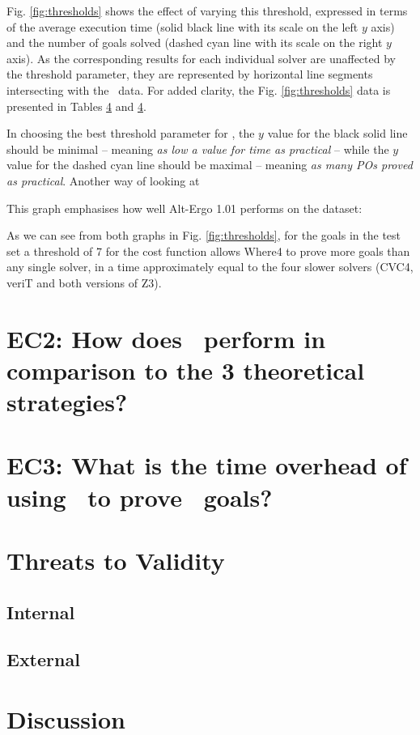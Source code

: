 Fig. \ref{fig:thresholds} shows the effect of varying this threshold, expressed in terms of the average execution time (solid black line with its scale on the left $y$ axis) and the number of goals solved (dashed cyan line with its scale on the right $y$ axis).
As the corresponding results for each individual solver are unaffected by the threshold parameter, they are represented by horizontal line segments intersecting with the \where~data.
For added clarity, the Fig. \ref{fig:thresholds} data is presented in Tables \ref{} and \ref{}.
  
In choosing the best threshold parameter for \where, the $y$ value for the black solid line should be minimal -- meaning \textit{as low a value for time as practical} -- while the $y$ value for the dashed cyan line should be maximal -- meaning \textit{as many POs proved as practical}. 
Another way of looking at 
 
This graph emphasises how well Alt-Ergo 1.01 performs on the dataset: 

As we can see from both graphs in Fig. \ref{fig:thresholds}, for the goals in the test set a threshold of 7 for the cost function allows \textsf{Where4} to prove more goals than any single solver, in a time approximately equal to the four slower solvers (CVC4, veriT and both versions of Z3). 



\section{EC2: How does \where~perform in comparison to the 3 theoretical strategies?}

\section{EC3: What is the time overhead of using \where~to prove \why~goals?}

\section{Threats to Validity}
\label{sec:threats}
\subsection{Internal}
\subsection{External}


\section{Discussion}